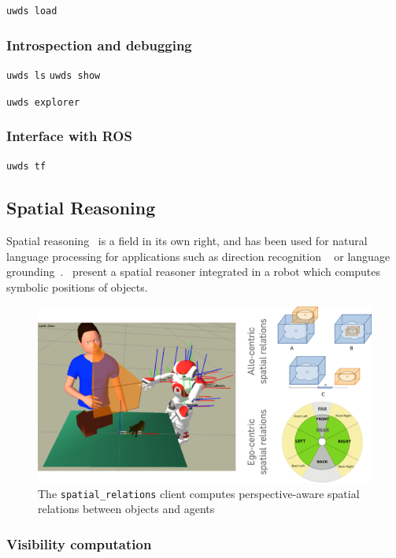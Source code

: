 \documentclass[letterpaper, 10 pt, conference]{ieeeconf}  %
\begin{document}
{\tt uwds load}

\subsubsection{Introspection and debugging}

{\tt uwds ls}
{\tt uwds show}

{\tt uwds explorer}


\subsubsection{Interface with ROS}

{\tt uwds tf}

\subsection{Spatial Reasoning}

Spatial reasoning~\cite{O'Keefe1999} is a field in its own right, and has been
used for natural language processing for applications such as direction
recognition ~\cite{Kollar2010,Matuszek2010} or language
grounding~\cite{Tellex2010}.~\cite{Skubic2004} present a spatial reasoner
integrated in a robot which computes symbolic positions of objects.

\begin{figure}
    \centering
    \includegraphics[width=0.9\linewidth]{spatialrelations}
    \caption{The {\tt spatial\_relations} client computes perspective-aware
    spatial relations between objects and agents}
    \label{fig|spatialrelations}
\end{figure}

\cite{Ros2010}

\subsubsection{Visibility computation}
\end{document}
